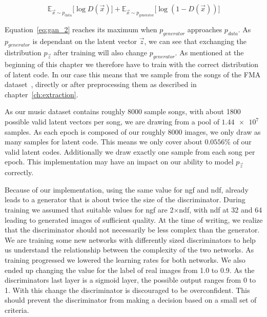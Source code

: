             \begin{equation}
                \mathbb{E}_{\vec{x} \sim p_{\text{data}}}
                    \bigl[ \log D(\vec{x}) \bigr] +
                \mathbb{E}_{\vec{x} \sim p_{\text{generator}}}
                    \bigl[ \log \left( 1 - D(\vec{x}) \right) \bigr]
                \label{eq:gan_2}
            \end{equation}

            Equation~\ref{eq:gan_2} reaches its maximum when $p_{generator}$ approaches $p_{data}$. As $p_{generator}$ is dependant on the latent vector $\vec{z}$, we can see that exchanging the distribution $p_{\vec{z}}$ after training will also change $p_{generator}$. As mentioned at the beginning of this chapter we therefore have to train with the correct distribution of latent code. In our case this means that we sample from the songs of the FMA dataset~\cite{FMA}, directly or after preprocessing them as described in chapter~\ref{ch:extraction}.

            As our music dataset contains roughly 8000 sample songs, with about 1800 possible valid latent vectors per song, we are drawing from a pool of $\num{1.44e7}$ samples. As each epoch is composed of our roughly 8000 images, we only draw as many samples for latent code. This means we only cover about $0.0556\%$ of our valid latent codes. Additionally we draw exactly one sample from each song per epoch. This implementation may have an impact on our ability to model $p_{\vec{z}}$ correctly.

            Because of our implementation, using the same value for ngf and ndf, already leads to a generator that is about twice the size of the discriminator. During training we assumed that suitable values for ngf are 2$\times$ndf, with ndf at 32 and 64 leading to generated images of sufficient quality. At the time of writing, we realize that the discriminator should not necessarily be less complex than the generator. We are training some new networks with differently sized discriminators to help us understand the relationship between the complexity of the two networks. As training progressed we lowered the learning rates for both networks. We also ended up changing the value for the label of real images from 1.0 to 0.9. As the discriminators last layer is a sigmoid layer, the possible output ranges from 0 to 1. With this change the discriminator is discouraged to be overconfident. This should prevent the discriminator from making a decision based on a small set of criteria.

